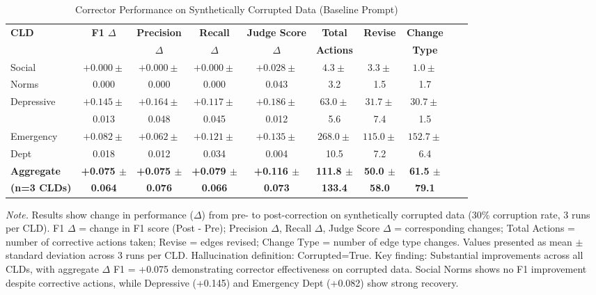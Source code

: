 \begin{table}[H]
\centering
\caption{Corrector Performance on Synthetically Corrupted Data (Baseline Prompt)}
\label{tab:rq1b_synthetic_correctness}
\begin{threeparttable}
\begin{tabular}{lccccccccc}
\toprule
\textbf{CLD} & \textbf{F1 $\Delta$} & \textbf{Precision} & \textbf{Recall} & \textbf{Judge Score} & \textbf{Total} & \textbf{Revise} & \textbf{Change} \\
 & & \textbf{$\Delta$} & \textbf{$\Delta$} & \textbf{$\Delta$} & \textbf{Actions} & & \textbf{Type} \\
\midrule
Social        & $+0.000 \pm$ & $+0.000 \pm$ & $+0.000 \pm$ & $+0.028 \pm$ & $4.3 \pm$ & $3.3 \pm$ & $1.0 \pm$ \\
Norms         & 0.000 & 0.000 & 0.000 & 0.043 & 3.2 & 1.5 & 1.7 \\
\midrule
Depressive    & $+0.145 \pm$ & $+0.164 \pm$ & $+0.117 \pm$ & $+0.186 \pm$ & $63.0 \pm$ & $31.7 \pm$ & $30.7 \pm$ \\
              & 0.013 & 0.048 & 0.045 & 0.012 & 5.6 & 7.4 & 1.5 \\
\midrule
Emergency     & $+0.082 \pm$ & $+0.062 \pm$ & $+0.121 \pm$ & $+0.135 \pm$ & $268.0 \pm$ & $115.0 \pm$ & $152.7 \pm$ \\
Dept          & 0.018 & 0.012 & 0.034 & 0.004 & 10.5 & 7.2 & 6.4 \\
\midrule
\textbf{Aggregate}  & \textbf{+0.075 $\pm$} & \textbf{+0.075 $\pm$} & \textbf{+0.079 $\pm$} & \textbf{+0.116 $\pm$} & \textbf{111.8 $\pm$} & \textbf{50.0 $\pm$} & \textbf{61.5 $\pm$} \\
\textbf{(n=3 CLDs)} & \textbf{0.064} & \textbf{0.076} & \textbf{0.066} & \textbf{0.073} & \textbf{133.4} & \textbf{58.0} & \textbf{79.1} \\
\bottomrule
\end{tabular}
\begin{tablenotes}
\small
\item \textit{Note.} Results show change in performance ($\Delta$) from pre- to post-correction on synthetically corrupted data (30\% corruption rate, 3 runs per CLD). 
F1 $\Delta$ = change in F1 score (Post - Pre); Precision $\Delta$, Recall $\Delta$, Judge Score $\Delta$ = corresponding changes; 
Total Actions = number of corrective actions taken; Revise = edges revised; Change Type = number of edge type changes. 
Values presented as mean $\pm$ standard deviation across 3 runs per CLD. 
Hallucination definition: Corrupted=True. 
Key finding: Substantial improvements across all CLDs, with aggregate $\Delta$ F1 = +0.075 demonstrating corrector effectiveness on corrupted data. Social Norms shows no F1 improvement despite corrective actions, while Depressive (+0.145) and Emergency Dept (+0.082) show strong recovery.
\end{tablenotes}
\end{threeparttable}
\end{table}

